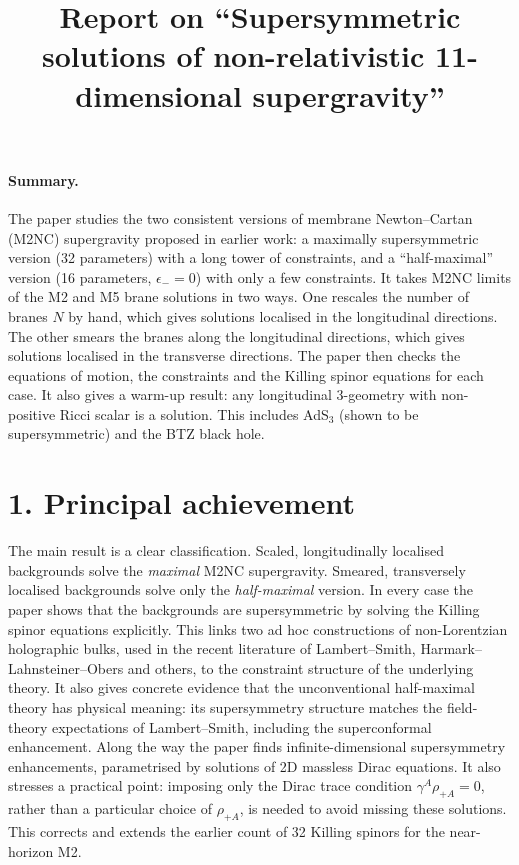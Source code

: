 \documentclass[11pt]{article}
\title{Report on ``Supersymmetric solutions of non-relativistic 11-dimensional supergravity''}
\date{}
\begin{document}
\maketitle

\paragraph{Summary.}
The paper studies the two consistent versions of membrane Newton--Cartan (M2NC) supergravity proposed in earlier work: a maximally supersymmetric version (32 parameters) with a long tower of constraints, and a ``half-maximal'' version (16 parameters, $\epsilon_-=0$) with only a few constraints. It takes M2NC limits of the M2 and M5 brane solutions in two ways. One rescales the number of branes $N$ by hand, which gives solutions localised in the longitudinal directions. The other smears the branes along the longitudinal directions, which gives solutions localised in the transverse directions. The paper then checks the equations of motion, the constraints and the Killing spinor equations for each case. It also gives a warm-up result: any longitudinal 3-geometry with non-positive Ricci scalar is a solution. This includes AdS$_3$ (shown to be supersymmetric) and the BTZ black hole.

\section*{1. Principal achievement}
The main result is a clear classification. Scaled, longitudinally localised backgrounds solve the \emph{maximal} M2NC supergravity. Smeared, transversely localised backgrounds solve only the \emph{half-maximal} version. In every case the paper shows that the backgrounds are supersymmetric by solving the Killing spinor equations explicitly. This links two ad hoc constructions of non-Lorentzian holographic bulks, used in the recent literature of Lambert--Smith, Harmark--Lahnsteiner--Obers and others, to the constraint structure of the underlying theory. It also gives concrete evidence that the unconventional half-maximal theory has physical meaning: its supersymmetry structure matches the field-theory expectations of Lambert--Smith, including the superconformal enhancement. Along the way the paper finds infinite-dimensional supersymmetry enhancements, parametrised by solutions of 2D massless Dirac equations. It also stresses a practical point: imposing only the Dirac trace condition $\gamma^A\rho_{+A}=0$, rather than a particular choice of $\rho_{+A}$, is needed to avoid missing these solutions. This corrects and extends the earlier count of 32 Killing spinors for the near-horizon M2.
\end{document}
